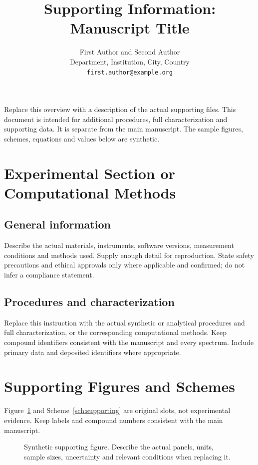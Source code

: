 \documentclass[11pt,a4paper]{article}
\title{Supporting Information: Manuscript Title}
\author{First Author and Second Author\\
  \small Department, Institution, City, Country\\
  \small \texttt{first.author@example.org}}
\date{}
\begin{document}
\maketitle
Replace this overview with a description of the actual supporting files.
This document is intended for additional procedures, full characterization
and supporting data. It is separate from the main manuscript. The sample
figures, schemes, equations and values below are synthetic.
\tableofcontents
\clearpage

\section{Experimental Section or Computational Methods}
\subsection{General information}
Describe the actual materials, instruments, software versions, measurement
conditions and methods used. Supply enough detail for reproduction.
State safety precautions and ethical approvals only where applicable and
confirmed; do not infer a compliance statement.

\subsection{Procedures and characterization}
Replace this instruction with the actual synthetic or analytical procedures
and full characterization, or the corresponding computational methods.
Keep compound identifiers consistent with the manuscript and every spectrum.
Include primary data and deposited identifiers where appropriate.

\section{Supporting Figures and Schemes}
Figure~\ref{fig:supporting} and Scheme~\ref{sch:supporting} are original slots,
not experimental evidence. Keep labels and compound numbers consistent
with the main manuscript.
\begin{figure}[htbp]
\centering
{}
\caption{Synthetic supporting figure. Describe the actual panels, units,
sample sizes, uncertainty and relevant conditions when replacing it.}
\label{fig:supporting}
\end{figure}
\end{document}
